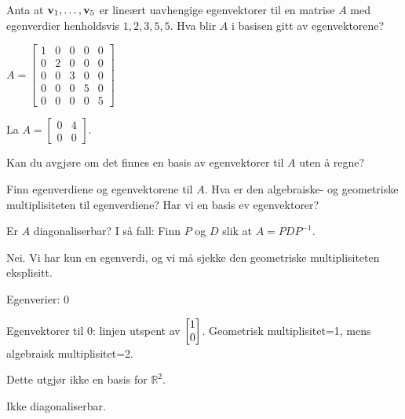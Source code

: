 



\begin{oppgave}
Anta at $\mathbf{v}_1,\dots,\mathbf{v}_5$ er lineært uavhengige egenvektorer til en matrise $A$ med egenverdier henholdsvis $1,2,3,5,5$.  Hva blir $A$ i basisen gitt av egenvektorene?

\end{oppgave}

\begin{losning}
$A=\begin{bmatrix}
1 & 0 & 0 & 0 & 0\\
0 & 2 & 0 & 0 & 0\\
0 & 0 & 3 & 0 & 0\\
0 & 0 & 0 & 5 & 0\\
0 & 0 & 0 & 0 & 5
\end{bmatrix}$
\end{losning}



\begin{oppgave}
La $A=\begin{bmatrix}
0 & 4\\
0 & 0
\end{bmatrix}$. 

\begin{punkt}
Kan du avgjøre om det finnes en basis av egenvektorer til $A$ uten å regne?
\end{punkt}

\begin{punkt}
Finn egenverdiene og egenvektorene til $A$. Hva er den algebraiske- og geometriske multiplisiteten til egenverdiene? Har vi en basis ev egenvektorer?
\end{punkt}

\begin{punkt}
Er $A$ diagonaliserbar? I så fall: Finn $P$ og $D$ slik at $A=PDP^{-1}$.
\end{punkt}

\end{oppgave}

\begin{losning}
\begin{punkt}
Nei. Vi har kun en egenverdi, og vi må sjekke den geometriske multiplisiteten eksplisitt.
\end{punkt}

\begin{punkt}
Egenverier: 0

\noindent
Egenvektorer til  0: linjen utspent av $\begin{bmatrix} 1 \\ 0 \end{bmatrix}$. Geometrisk multiplisitet=1, mens algebraisk multiplisitet=2.

\noindent
Dette utgjør ikke en basis for $\mathbb{R}^2$.
\end{punkt}

Ikke diagonaliserbar.

\end{losning}

